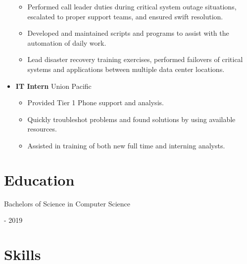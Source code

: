 \documentclass[10pt, a4paper]{article}
\begin{document}
\begin{itemize}
\begin{itemize}
        \item Performed call leader duties during critical system outage situations, escalated to proper support teams, and ensured swift resolution.
        \item Developed and maintained scripts and programs to assist with the automation of daily work.
        \item Lead disaster recovery training exercises, performed failovers of critical systems and applications between multiple data center locations.
    \end{itemize}
    \item \textbf{IT Intern} Union Pacific
    \begin{itemize}
        \item Provided Tier 1 Phone support and analysis.
        \item Quickly troubleshot problems and found solutions by using available resources.
        \item Assisted in training of both new full time and interning analysts.
    \end{itemize}
\end{itemize}
\section*{Education}
    \begin{minipage}{0.5\textwidth} %
        \raggedright %
        Bachelors of Science in Computer Science
      \end{minipage}
      \begin{minipage}{0.5\textwidth} %
         \-- 2019
      \end{minipage}

\section*{Skills}
\end{document}
